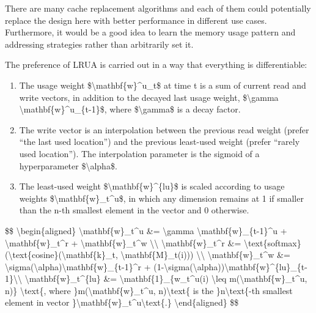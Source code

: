 There are many cache replacement algorithms and each of them could potentially replace the design here with better performance in different use cases. Furthermore, it would be a good idea to learn the memory usage pattern and addressing strategies rather than arbitrarily set it.

The preference of LRUA is carried out in a way that everything is differentiable:

\begin{enumerate}
\tightlist
\item
  The usage weight \$\textbackslash mathbf\{w\}\^{}u\_t\$ at time t is a sum of current read and write vectors, in addition to the decayed last usage weight, \$\textbackslash gamma \textbackslash mathbf\{w\}\^{}u\_\{t-1\}\$, where \$\textbackslash gamma\$ is a decay factor.
\item
  The write vector is an interpolation between the previous read weight (prefer ``the last used location'') and the previous least-used weight (prefer ``rarely used location''). The interpolation parameter is the sigmoid of a hyperparameter \$\textbackslash alpha\$.
\item
  The least-used weight \$\textbackslash mathbf\{w\}\^{}\{lu\}\$ is scaled according to usage weights \$\textbackslash mathbf\{w\}\_t\^{}u\$, in which any dimension remains at 1 if smaller than the n-th smallest element in the vector and 0 otherwise.
\end{enumerate}

\$\$ \textbackslash begin\{aligned\} \textbackslash mathbf\{w\}\_t\^{}u \&= \textbackslash gamma \textbackslash mathbf\{w\}\_\{t-1\}\^{}u + \textbackslash mathbf\{w\}\_t\^{}r + \textbackslash mathbf\{w\}\_t\^{}w \textbackslash\textbackslash{} \textbackslash mathbf\{w\}\_t\^{}r \&= \textbackslash text\{softmax\}(\textbackslash text\{cosine\}(\textbackslash mathbf\{k\}\_t, \textbackslash mathbf\{M\}\_t(i))) \textbackslash\textbackslash{} \textbackslash mathbf\{w\}\_t\^{}w \&= \textbackslash sigma(\textbackslash alpha)\textbackslash mathbf\{w\}\_\{t-1\}\^{}r + (1-\textbackslash sigma(\textbackslash alpha))\textbackslash mathbf\{w\}\^{}\{lu\}\_\{t-1\}\textbackslash\textbackslash{} \textbackslash mathbf\{w\}\_t\^{}\{lu\} \&= \textbackslash mathbf\{1\}\_\{w\_t\^{}u(i) \textbackslash leq m(\textbackslash mathbf\{w\}\_t\^{}u, n)\} \textbackslash text\{, where \}m(\textbackslash mathbf\{w\}\_t\^{}u, n)\textbackslash text\{ is the \}n\textbackslash text\{-th smallest element in vector \}\textbackslash mathbf\{w\}\_t\^{}u\textbackslash text\{.\} \textbackslash end\{aligned\} \$\$

